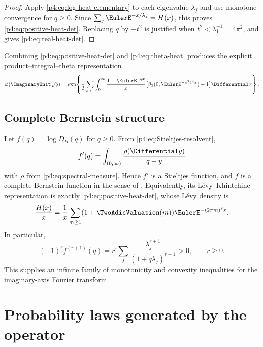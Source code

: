 \documentclass[11pt]{article}
\theoremstyle{definition}
\theoremstyle{remark}
\newcommand{\phiF}{\varphi}
\begin{document}
\begin{proof}
Apply \eqref{p4:eq:log-heat-elementary} to each eigenvalue \(\lambda_j\) and use monotone
convergence for \(q\ge0\).  Since
\(\sum_j\EulerE^{-x/\lambda_j}=H(x)\), this proves
\eqref{p4:eq:positive-heat-det}.  Replacing \(q\) by \(-t^2\) is justified when
\(t^2<\lambda_1^{-1}=4\pi^2\), and gives \eqref{p4:eq:real-heat-det}.
\end{proof}

Combining \eqref{p4:eq:positive-heat-det} and \eqref{p4:eq:theta-heat} produces the explicit
product--integral--theta representation
\begin{equation}
 \phiF(\ImaginaryUnit\sqrt q)=
 \exp\!\left\{
 \frac12\sum_{n\ge1}\int_0^\infty
 \frac{1-\EulerE^{-qx}}x
 \bigl[\vartheta_3(0,\EulerE^{-\pi^24^nx})-1\bigr]\Differential x
 \right\}.
 \label{p4:eq:theta-det-combination}
\end{equation}

\subsection{Complete Bernstein structure}
\label{p4:sec:CBF}

Let \(f(q)=\log D_B(q)\) for \(q\ge0\).  From
\eqref{p4:eq:Stieltjes-resolvent},
\begin{equation}
 f'(q)=\int_{(0,\infty)}\frac{\rho(\Differential y)}{q+y}
 \label{p4:eq:fprime-Stieltjes}
\end{equation}
with \(\rho\) from \eqref{p4:eq:spectral-measure}.  Hence \(f'\) is a Stieltjes function,
and \(f\) is a complete Bernstein function in the sense of
\cite{p4:SchillingBernstein}.  Equivalently, its L\'evy--Khintchine
representation is exactly \eqref{p4:eq:positive-heat-det}, whose L\'evy density is
\begin{equation}
 \frac{H(x)}x
 =\frac1x\sum_{m\ge1}(1+\TwoAdicValuation(m))\EulerE^{-(2\pi m)^2x}.
 \label{p4:eq:Levy-density}
\end{equation}
In particular,
\begin{equation}
 (-1)^r f^{(r+1)}(q)
 =r!\sum_j\frac{\lambda_j^{r+1}}{(1+q\lambda_j)^{r+1}}>0,
 \qquad r\ge0.
 \label{p4:eq:Bernstein-signs}
\end{equation}
This supplies an infinite family of monotonicity and convexity inequalities for the
imaginary-axis Fourier transform.

\section{Probability laws generated by the operator}
\label{p4:sec:prob-operator}
\end{document}
